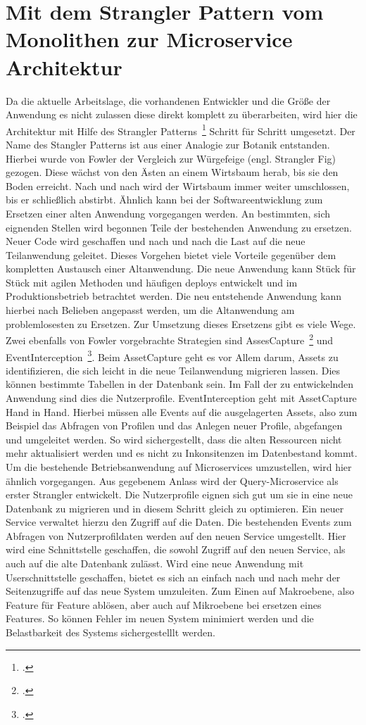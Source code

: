 \section{Mit dem Strangler Pattern vom Monolithen zur Microservice Architektur}
Da die aktuelle Arbeitslage, die vorhandenen Entwickler und die Größe der Anwendung es nicht zulassen diese direkt komplett zu überarbeiten, wird hier die Architektur mit Hilfe des Strangler Patterns~\footcite[][]{Fowler:Strangler} Schritt für Schritt umgesetzt.
Der Name des Stangler Patterns ist aus einer Analogie zur Botanik entstanden. Hierbei wurde von Fowler der Vergleich zur Würgefeige (engl. Strangler Fig) gezogen. Diese wächst von den Ästen an einem Wirtsbaum herab, bis sie den Boden erreicht. Nach und nach wird der Wirtsbaum immer weiter umschlossen, bis er schließlich abstirbt.
Ähnlich kann bei der Softwareentwicklung zum Ersetzen einer alten Anwendung vorgegangen werden. An bestimmten, sich eignenden Stellen wird begonnen Teile der bestehenden Anwendung zu ersetzen. Neuer Code wird geschaffen und nach und nach die Last auf die neue Teilanwendung geleitet.
Dieses Vorgehen bietet viele Vorteile gegenüber dem kompletten Austausch einer Altanwendung. Die neue Anwendung kann Stück für Stück mit agilen Methoden und häufigen deploys entwickelt und im Produktionsbetrieb betrachtet werden. Die neu entstehende Anwendung kann hierbei nach Belieben angepasst werden, um die Altanwendung am problemlosesten zu Ersetzen.
Zur Umsetzung dieses Ersetzens gibt es viele Wege. Zwei ebenfalls von Fowler vorgebrachte Strategien sind AssesCapture~\footcite[][]{Fowler:Capture} und EventInterception~\footcite[][]{Fowler:Interception}.
Beim AssetCapture geht es vor Allem darum, Assets zu identifizieren, die sich leicht in die neue Teilanwendung migrieren lassen. Dies können bestimmte Tabellen in der Datenbank sein. Im Fall der zu entwickelnden Anwendung sind dies die Nutzerprofile.
EventInterception geht mit AssetCapture Hand in Hand. Hierbei müssen alle Events auf die ausgelagerten Assets, also zum Beispiel das Abfragen von Profilen und das Anlegen neuer Profile, abgefangen und umgeleitet werden.
So wird sichergestellt, dass die alten Ressourcen nicht mehr aktualisiert werden und es nicht zu Inkonsitenzen im Datenbestand kommt.
Um die bestehende Betriebsanwendung auf Microservices umzustellen, wird hier ähnlich vorgegangen. Aus gegebenem Anlass wird der Query-Microservice als erster Strangler entwickelt. Die Nutzerprofile eignen sich gut um sie in eine neue Datenbank zu migrieren und in diesem Schritt gleich zu optimieren. Ein neuer Service verwaltet hierzu den Zugriff auf die Daten. Die bestehenden Events zum Abfragen von Nutzerprofildaten werden auf den neuen Service umgestellt. Hier wird eine Schnittstelle geschaffen, die sowohl Zugriff auf den neuen Service, als auch auf die alte Datenbank zulässt. Wird eine neue Anwendung mit Userschnittstelle geschaffen, bietet es sich an einfach nach und nach mehr der Seitenzugriffe auf das neue System umzuleiten. Zum Einen auf Makroebene, also Feature für Feature ablösen, aber auch auf Mikroebene bei ersetzen eines Features. So können Fehler im neuen System minimiert werden und die Belastbarkeit des Systems sichergestelllt werden.
